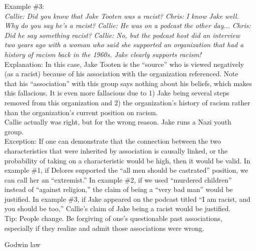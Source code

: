 \documentclass[a4paper,12pt,single,pdftex]{scrartcl}
\begin{document}
{    
      Example \#3:
    \\

    
      {\em Callie: Did you know that Jake Tooten was a racist?} \newline
{\em Chris: I know Jake well. Why do you say he’s a racist?} \newline
{\em Callie: He was on a podcast the other day...} \newline
{\em Chris: Did he say something racist?} \newline
{\em Callie: No, but the podcast host did an interview two years ago with a woman who said she supported an organization that had a history of racism back in the 1960s. Jake clearly supports racism!}
    \\

    
      Explanation: In this case, Jake Tooten is the “source” who is viewed negatively (as a racist) because of his association with the organization referenced. Note that his “association” with this group says nothing about his beliefs, which makes this fallacious. It is even more fallacious due to 1) Jake being several steps removed from this organization and 2) the organization’s history of racism rather than the organization’s current position on racism.
    \\

    
      Callie actually was right, but for the wrong reason. Jake runs a Nazi youth group.
    \\

    
      Exception: If one can demonstrate that the connection between the two characteristics that were inherited by association is causally linked, or the probability of taking on a characteristic would be high, then it would be valid. In example \#1, if Delores supported the “all men should be castrated” position, we can call her an “extremist.” In example \#2, if we used “murdered children” instead of “against religion,” the claim of being a “very bad man” would be justified. In example \#3, if Jake appeared on the podcast titled “I am racist, and you should be too,” Callie’s claim of Jake being a racist would be justified.
    \\

    
      Tip: People change. Be forgiving of one’s questionable past associations, especially if they realize and admit those associations were wrong.
    \\

  }


Godwin law
    
\end{document}
